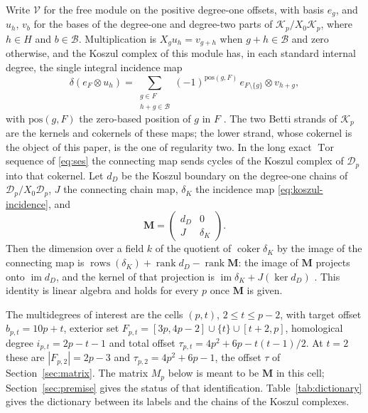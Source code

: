 \documentclass[11pt]{article}
\theoremstyle{definition}
\theoremstyle{remark}
\begin{document}
Write $\mathcal V$ for the free module on the positive degree-one offsets, with
basis $e_g$, and $u_h$, $v_b$ for the bases of the degree-one and degree-two
parts of $\mathcal K_p/X_0\mathcal K_p$, where $h\in H$ and $b\in\mathcal B$.
Multiplication is $X_gu_h=v_{g+h}$ when $g+h\in\mathcal B$ and zero otherwise,
and the Koszul complex of this module has, in each standard internal degree, the
single integral incidence map
\begin{equation}\label{eq:koszul-incidence}
 \delta(e_F\otimes u_h)=\sum_{\substack{g\in F\\h+g\in\mathcal B}}
 (-1)^{\mathrm{pos}(g,F)}\,e_{F\setminus\{g\}}\otimes v_{h+g},
\end{equation}
with $\mathrm{pos}(g,F)$ the zero-based position of $g$ in $F$
\cite{CAOSMain}. The two Betti strands of $\mathcal K_p$ are the kernels and
cokernels of these maps; the lower strand, whose cokernel is the object of this
paper, is the one of regularity two. In the long exact $\operatorname{Tor}$
sequence of \eqref{eq:ses} the connecting map sends cycles of the Koszul
complex of $\mathcal D_p$ into that cokernel. Let $d_D$ be the Koszul boundary on
the degree-one chains of $\mathcal D_p/X_0\mathcal D_p$, $J$ the connecting chain
map, $\delta_K$ the incidence map \eqref{eq:koszul-incidence}, and
\begin{equation}\label{eq:blockmatrix}
 \mathbf M=\begin{pmatrix}d_D&0\\J&\delta_K\end{pmatrix}.
\end{equation}
Then the dimension over a field $k$ of the quotient of
$\operatorname{coker}\delta_K$ by the image of the connecting map is
$\operatorname{rows}(\delta_K)+\operatorname{rank}d_D-\operatorname{rank}\mathbf M$:
the image of $\mathbf M$ projects onto $\operatorname{im}d_D$, and the kernel of
that projection is $\operatorname{im}\delta_K+J(\ker d_D)$ \cite{CAOSMain}. This
identity is linear algebra and holds for every $p$ once $\mathbf M$ is given.

The multidegrees of interest are the cells $(p,t)$, $2\leq t\leq p-2$, with
target offset $b_{p,t}=10p+t$, exterior set
$F_{p,t}=[3p,4p-2]\cup\{t\}\cup[t+2,p]$, homological degree $i_{p,t}=2p-t-1$
and total offset $\tau_{p,t}=4p^2+6p-t(t-1)/2$. At $t=2$ these are
$|F_{p,2}|=2p-3$ and $\tau_{p,2}=4p^2+6p-1$, the offset $\tau$ of
Section~\ref{sec:matrix}. The matrix $M_p$ below is meant to be $\mathbf M$ in this cell; Section~\ref{sec:premise} gives the status of that identification.
Table~\ref{tab:dictionary} gives the dictionary between its labels and the
chains of the Koszul complexes.
\end{document}
